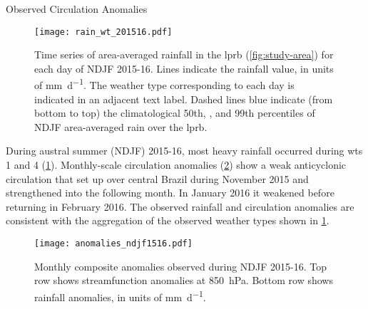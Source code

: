 \begin{block}{Observed Circulation Anomalies}
    \begin{framed}
        \begin{figure}
            \centering
            \caption{
                Time series of area-averaged rainfall in the \acrlong{lprb} (\cref{fig:study-area}) for each day of NDJF  2015-16.
                Lines indicate the rainfall value, in units of \si{\milli\meter\per\day}.
                The weather type corresponding to each day is indicated in an adjacent text label.
                Dashed lines blue indicate (from bottom to top) the climatological 50th, , and 99th percentiles of NDJF area-averaged rain over the \acrlong{lprb}.
            }
            \noindent\texttt{[image: rain\_wt\_201516.pdf]}
            \label{fig:rain-wtype}
        \end{figure}
    \end{framed}
    During austral summer (NDJF) 2015-16, most heavy rainfall occurred during \glspl{wt} 1 and 4 (\cref{fig:rain-wtype}). 
    Monthly-scale circulation anomalies (\cref{fig:anomaly-ndjf}) show a weak anticyclonic circulation that set up over central Brazil during November 2015 and strengthened into the following month.
    In January 2016 it weakened before returning in February 2016.
    The observed rainfall and circulation anomalies are consistent with the aggregation of the observed weather types shown in \cref{fig:rain-wtype}.
    \begin{framed}
        \begin{figure}
            \centering
            \noindent\texttt{[image: anomalies\_ndjf1516.pdf]}
            \caption{
                Monthly composite anomalies observed during NDJF 2015-16.
                Top row shows streamfunction anomalies at \SI{850}{\hecto\pascal}.
                Bottom row shows rainfall anomalies, in units of \si{\milli\meter\per\day}.
            }
            \label{fig:anomaly-ndjf}
        \end{figure}
    \end{framed}
\end{block}
